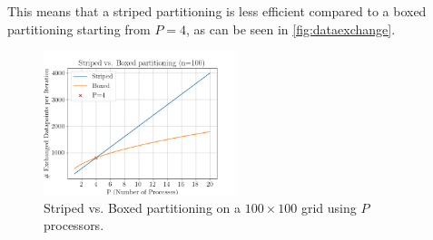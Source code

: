 This means that a striped partitioning is less efficient compared to a boxed partitioning starting from $P=4$, as can be seen in \autoref{fig:dataexchange}.\\
\begin{figure}[H]
    \centering
    \includegraphics[width=0.5\textwidth]{../fig/lab2/scale23.png}
    \caption{Striped vs. Boxed partitioning on a $100\times100$ grid using $P$ processors.}
    \label{fig:dataexchange}
\end{figure}
